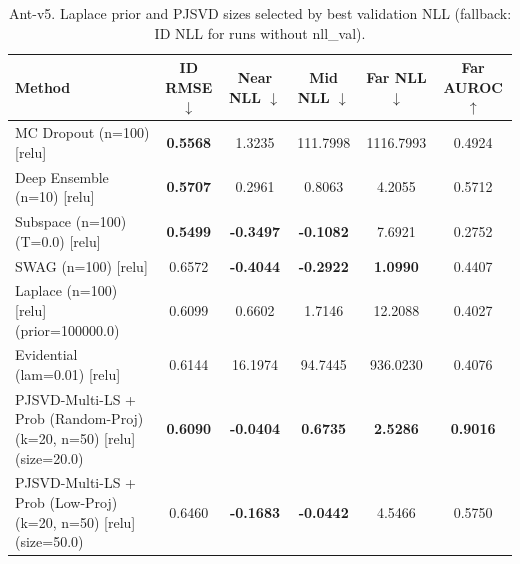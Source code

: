 \begin{table}[t]
\centering
\caption{Ant-v5. Laplace prior and PJSVD sizes selected by best validation NLL (fallback: ID NLL for runs without nll_val).}
\begin{tabular}{lccccc}
\toprule
Method & ID RMSE $\downarrow$ & Near NLL $\downarrow$ & Mid NLL $\downarrow$ & Far NLL $\downarrow$ & Far AUROC $\uparrow$ \\
\midrule
MC Dropout (n=100) [relu] & \textbf{0.5568} & 1.3235 & 111.7998 & 1116.7993 & 0.4924 \\
Deep Ensemble (n=10) [relu] & \textbf{0.5707} & 0.2961 & 0.8063 & 4.2055 & 0.5712 \\
Subspace (n=100) (T=0.0) [relu] & \textbf{0.5499} & \textbf{-0.3497} & \textbf{-0.1082} & 7.6921 & 0.2752 \\
SWAG (n=100) [relu] & 0.6572 & \textbf{-0.4044} & \textbf{-0.2922} & \textbf{1.0990} & 0.4407 \\
Laplace (n=100) [relu] (prior=100000.0) & 0.6099 & 0.6602 & 1.7146 & 12.2088 & 0.4027 \\
Evidential (lam=0.01) [relu] & 0.6144 & 16.1974 & 94.7445 & 936.0230 & 0.4076 \\
PJSVD-Multi-LS + Prob (Random-Proj) (k=20, n=50) [relu] (size=20.0) & \textbf{0.6090} & \textbf{-0.0404} & \textbf{0.6735} & \textbf{2.5286} & \textbf{0.9016} \\
PJSVD-Multi-LS + Prob (Low-Proj) (k=20, n=50) [relu] (size=50.0) & 0.6460 & \textbf{-0.1683} & \textbf{-0.0442} & 4.5466 & 0.5750 \\
\bottomrule
\end{tabular}
\end{table}

